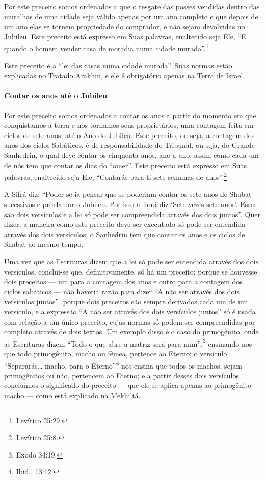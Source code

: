 Por este preceito somos ordenados a que o resgate das posses vendidas
dentro das muralhas de uma cidade seja válido apenas por um ano
completo e que depois de um ano elas se tornem propriedade do
comprador, e não sejam devolvidas no Jubileu. Este preceito está
expresso em Suas palavras, enaltecido seja Ele, ``E quando o homem
vender casa de moradia numa cidade murada''.\footnote{Levítico 25:29.}

Este preceito é a ``lei das casas numa cidade murada''. Suas normas
estão explicadas no Tratado Arakhin, e ele é obrigatório apenas na Terra
de Israel.

\paragraph{Contar os anos até o Jubileu}

Por este preceito somos ordenados a contar os anos a partir do momento
em que conquistamos a terra e nos tornamos seus proprietários, uma
contagem feita em ciclos de sete anos, até o Ano do Jubileu. Este
preceito, ou seja, a contagem dos anos dos ciclos Sabáticos, é de
responsabilidade do Tribunal, ou seja, do Grande Sanhedrin, o qual deve
contar os cinquenta anos, ano a ano, assim como cada um de nós tem que
contar os dias do ``omer''. Este preceito está expresso em Suas
palavras, enaltecido seja Ele, ``Contarás para ti sete semanas de anos''.\footnote{Levítico 25:8.}

A Sifrá diz: ``Poder-se-ia pensar que se poderiam contar os sete anos de
Shabat sucessivos e proclamar o Jubileu. Por isso a Torá diz `Sete
vezes sete anos'. Esses são dois versículos e a lei só pode ser
compreendida através dos dois juntos''. Quer dizer, a maneira como este
preceito deve ser executado só pode ser entendida através dos dois
versículos: o Sanhedrin tem que contar os anos e os ciclos de Shabat ao
mesmo tempo.

Uma vez que as Escrituras dizem que a lei só pode ser entendida através
dos dois versículos, conclui-se que, definitivamente, só há um preceito;
porque se houvesse dois preceitos --- um para a contagem dos anos e
outro para a contagem dos ciclos sabáticos --- não haveria razão para
dizer ``A não ser através dos dois versículos juntos'', porque dois
preceitos são sempre derivados cada um de um versículo, e a expressão
``A não ser através dos dois versículos juntos'' só é usada com relação
a um único preceito, cujas normas só podem
ser compreendidas por completo através de dois textos. Um exemplo disso
é o caso do primogênito, onde as Escrituras dizem ``Todo o que abre a
matriz será para mim'',\footnote{Exodo 34:19.} ensinando-nos que todo
primogênito, macho ou fêmea, pertence ao Eterno; o versículo
``Separarás\ldots{} macho, para o Eterno''\footnote{Ibid., 13:12.} nos ensina que
todos os machos, sejam primogênitos ou não, pertencem ao Eterno; e a
partir desses dois versículos concluímos o significado do preceito ---
que ele se aplica apenas ao primogênito macho --- como está explicado na
Mekhiltá.

